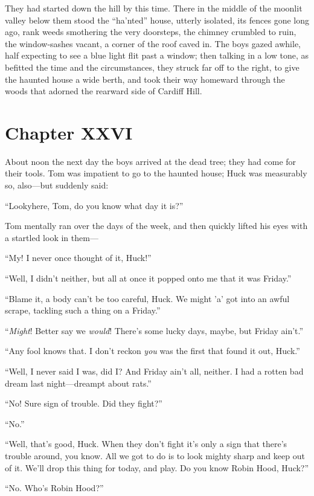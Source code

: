 \documentclass{book}
\begin{document}
They had started down the hill by this time. There in the middle of the moonlit valley below them stood the “ha’nted” house, utterly isolated, its fences gone long ago, rank weeds smothering the very doorsteps, the chimney crumbled to ruin, the window-sashes vacant, a corner of the roof caved in. The boys gazed awhile, half expecting to see a blue light flit past a window; then talking in a low tone, as befitted the time and the circumstances, they struck far off to the right, to give the haunted house a wide berth, and took their way homeward through the woods that adorned the rearward side of Cardiff Hill.

\chapter*{Chapter XXVI}

About noon the next day the boys arrived at the dead tree; they had come for their tools. Tom was impatient to go to the haunted house; Huck was measurably so, also—but suddenly said:

“Lookyhere, Tom, do you know what day it is?”

Tom mentally ran over the days of the week, and then quickly lifted his eyes with a startled look in them—

“My! I never once thought of it, Huck!”

“Well, I didn’t neither, but all at once it popped onto me that it was Friday.”

“Blame it, a body can’t be too careful, Huck. We might ’a’ got into an awful scrape, tackling such a thing on a Friday.”

“\emph{Might}! Better say we \emph{would}! There’s some lucky days, maybe, but Friday ain’t.”

“Any fool knows that. I don’t reckon \emph{you} was the first that found it out, Huck.”

“Well, I never said I was, did I? And Friday ain’t all, neither. I had a rotten bad dream last night—dreampt about rats.”

“No! Sure sign of trouble. Did they fight?”

“No.”

“Well, that’s good, Huck. When they don’t fight it’s only a sign that there’s trouble around, you know. All we got to do is to look mighty sharp and keep out of it. We’ll drop this thing for today, and play. Do you know Robin Hood, Huck?”

“No. Who’s Robin Hood?”
\end{document}

